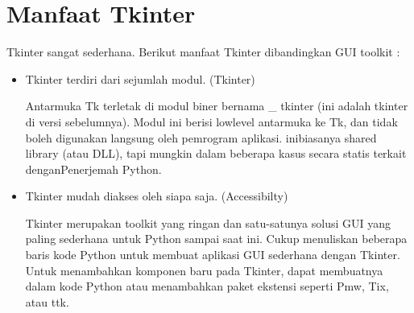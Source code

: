 \documentclass [12pt,a4paper,notitlepage,oneside,bahasa]{article}
\begin{document}
\section{Manfaat Tkinter} \par
Tkinter sangat sederhana. Berikut manfaat Tkinter dibandingkan GUI toolkit : \par
\noindent 
\begin{itemize}
	\item Tkinter terdiri dari sejumlah modul.  (Tkinter)\vspace{\baselineskip} \par
	Antarmuka Tk terletak di modul biner bernama \_ tkinter (ini adalah tkinter di versi sebelumnya). Modul ini berisi lowlevel antarmuka ke Tk, dan tidak boleh digunakan langsung oleh pemrogram aplikasi. inibiasanya shared library (atau DLL), tapi mungkin dalam beberapa kasus secara statis terkait denganPenerjemah Python.
	\item Tkinter mudah diakses oleh siapa saja. (Accessibilty)\vspace{\baselineskip} \par
	Tkinter merupakan toolkit yang ringan dan satu-satunya solusi GUI yang paling sederhana untuk Python sampai saat ini. Cukup menuliskan beberapa baris kode Python untuk membuat aplikasi GUI sederhana dengan Tkinter. Untuk menambahkan komponen baru pada Tkinter, dapat membuatnya dalam kode Python atau menambahkan paket ekstensi seperti Pmw, Tix, atau ttk.
	

\end{itemize}
\end{document}
